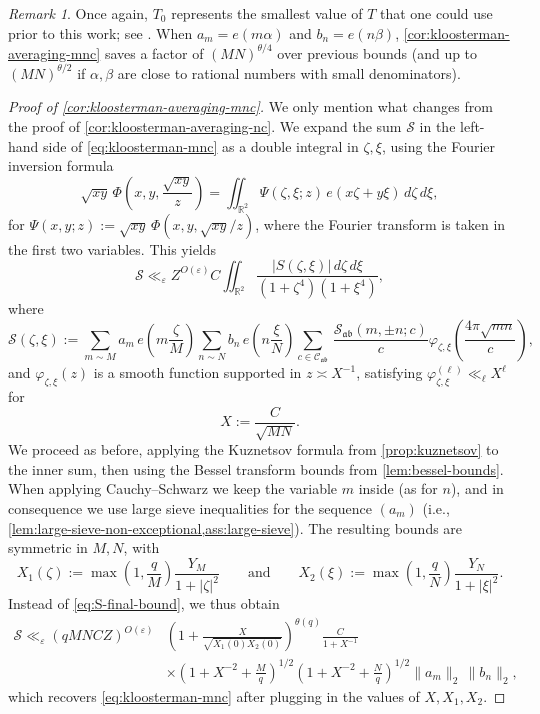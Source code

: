 \documentclass[reqno,11pt]{amsart}
\theoremstyle{remark}
\newtheorem*{remark}{Remark}
\numberwithin{equation}{section}
\newcommand{\R}{\mathbb{R}}
\newcommand{\mC}{\mathcal{C}}
\newcommand{\mS}{\mathcal{S}}
\newcommand{\ma}{\mathfrak{a}}
\newcommand{\mb}{\mathfrak{b}}
\newcommand{\eps}{\varepsilon}
\renewcommand{\hat}{\widehat}
\begin{document}
\begin{remark}
Once again, $T_0$ represents the smallest value of $T$ that one could use prior to this work; see \cite[Theorem 9]{deshouillers1982kloosterman}. When $a_m = e(m\alpha)$ and $b_n = e(n\beta)$, \cref{cor:kloosterman-averaging-mnc} saves a factor of $(MN)^{\theta/4}$ over previous bounds (and up to $(MN)^{\theta/2}$ if $\alpha, \beta$ are close to rational numbers with small denominators).
\end{remark}

\begin{proof}[Proof of \cref{cor:kloosterman-averaging-mnc}]
We only mention what changes from the proof of \cref{cor:kloosterman-averaging-nc}. We expand the sum $\mS$ in the left-hand side of \cref{eq:kloosterman-mnc} as a double integral in $\zeta, \xi$, using the Fourier inversion formula 
\[
    \sqrt{xy}\,\Phi\left(x, y, \frac{\sqrt{xy}}{z} \right) = \iint_{\R^2} \hat{\Psi}(\zeta, \xi; z) \, e(x\zeta + y\xi)\, d\zeta\, d\xi,
\]
for $\Psi(x, y; z) := \sqrt{xy}\, \Phi(x, y, \sqrt{xy}/z)$, where the Fourier transform is taken in the first two variables. This yields
\[
    \mS \ll_\eps Z^{O(\eps)} C \iint_{\R^2} \frac{|S(\zeta, \xi)|\, d\zeta\, d\xi}{(1 + \zeta^4)(1 + \xi^4)},
\]
where 
\[
    \mS(\zeta, \xi) := \sum_{m \sim M} a_m\, e\left(m\frac{\zeta}{M}\right) \sum_{n \sim N} b_n\, e\left(n\frac{\xi}{N}\right) 
    \sum_{c \in \mC_{\ma\mb}}\,
    \frac{\mS_{\ma\mb}(m, \pm n; c)}{c} 
    \varphi_{\zeta,\xi}\left(\frac{4\pi \sqrt{mn}}{c}\right),
\]
and $\varphi_{\zeta,\xi}(z)$ is a smooth function supported in $z \asymp X^{-1}$, satisfying $\varphi_{\zeta,\xi}^{(\ell)} \ll_\ell X^\ell$ for
\[
    X := \frac{C}{\sqrt{MN}}.
\]
We proceed as before, applying the Kuznetsov formula from \cref{prop:kuznetsov} to the inner sum, then using the Bessel transform bounds from \cref{lem:bessel-bounds}. When applying Cauchy--Schwarz we keep the variable $m$ inside (as for $n$), and in consequence we use large sieve inequalities for the sequence $(a_m)$ (i.e., \cref{lem:large-sieve-non-exceptional,ass:large-sieve}). The resulting bounds are symmetric in $M, N$, with
\[
    X_1(\zeta) := \max\left(1, \frac{q}{M}\right) \frac{Y_M}{1 + |\zeta|^2}
    \qquad 
    \text{and}
    \qquad
    X_2(\xi) := \max\left(1, \frac{q}{N}\right) \frac{Y_N}{1 + |\xi|^2}.
\]
Instead of \cref{eq:S-final-bound}, we thus obtain
\begin{equation} \label{eq:S-final-bound-2}
\begin{aligned}
    \mS \ll_\eps (qMNCZ)^{O(\eps)}
    &\left(1 + \frac{X}{\sqrt{X_1(0) X_2(0)}} \right)^{\theta(q)}
    \frac{C}{1+X^{-1}} 
    \\
    &\times 
    \left(1 + X^{-2} + \frac{M}{q}\right)^{1/2}
    \left(1 + X^{-2} + \frac{N}{q}\right)^{1/2} \|a_m\|_2\, \|b_n\|_2,
\end{aligned}
\end{equation}
which recovers \cref{eq:kloosterman-mnc} after plugging in the values of $X, X_1, X_2$.


\end{proof}
\end{document}
